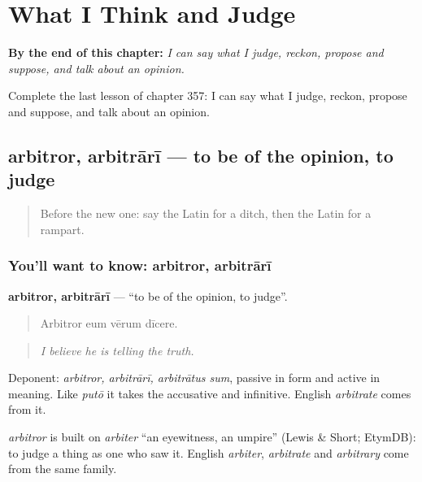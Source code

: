 
\chapter{What I Think and Judge}
\label{ch:la-what-i-think-and-judge}

\begin{chapteropening}
\textbf{By the end of this chapter:} \emph{I can say what I judge, reckon, propose and suppose, and talk about an opinion.}

Complete the last lesson of chapter 357: I can say what I judge, reckon, propose and suppose, and talk about an opinion.
\end{chapteropening}

\section[arbitror, arbitrārī]{arbitror, arbitrārī — to be of the opinion, to judge}

\label{lesson:LA-C357-arbitror}



\begin{quote}
Before the new one: say the Latin for a ditch, then the Latin for a rampart.
\end{quote}

\subsection*{You'll want to know: arbitror, arbitrārī}
\textbf{arbitror, arbitrārī} — \textquotedblleft{}to be of the opinion, to judge\textquotedblright{}.

\begin{quote}
Arbitror eum vērum dīcere.
\end{quote}

\begin{quote}
\emph{I believe he is telling the truth.}
\end{quote}

Deponent: \emph{arbitror, arbitrārī, arbitrātus sum}, passive in form and active in meaning. Like \emph{putō} it takes the accusative and infinitive. English \emph{arbitrate} comes from it.

\begin{cousinweb}
\emph{arbitror} is built on \emph{arbiter} \textquotedblleft{}an eyewitness, an umpire\textquotedblright{} (Lewis \& Short; EtymDB): to judge a thing as one who saw it. English \emph{arbiter}, \emph{arbitrate} and \emph{arbitrary} come from the same family.
\end{cousinweb}

